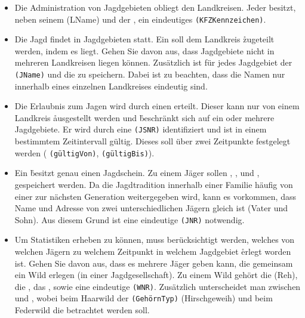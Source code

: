 \documentclass{bschlangaul-aufgabe}
\begin{document}
\begin{itemize}
\item Die Administration von Jagdgebieten obliegt den Landkreisen. Jeder
 besitzt, neben seinem  (LName) und der
, ein eindeutiges 
\texttt{(KFZKennzeichen)}.

\item Die Jagd findet in Jagdgebieten statt. Ein  soll dem
Landkreis \r{zugeteilt} werden, indem es liegt. Gehen Sie davon aus,
dass Jagdgebiete nicht in mehreren Landkreisen liegen können. Zusätzlich
ist für jedes Jagdgebiet der  \texttt{(JName)} und die
 zu speichern. Dabei ist zu beachten, dass die Namen nur
innerhalb eines einzelnen Landkreises eindeutig sind.

\item Die Erlaubnis zum Jagen wird durch einen  erteilt.
Dieser kann nur von einem Landkreis \r{ausgestellt} werden und
\r{beschränkt} sich auf ein oder mehrere Jagdgebiete. Er wird durch eine
 \texttt{(JSNR)} identifiziert und ist in einem
bestimmtem Zeitintervall gültig. Dieses soll über zwei Zeitpunkte
festgelegt werden ( \texttt{(gültigVon)}, 
\texttt{(gültigBis)}).

\item Ein  \r{besitzt} genau einen Jagdschein. Zu einem Jäger
sollen , ,  und , gespeichert
werden. Da die Jagdtradition innerhalb einer Familie häufig von einer
zur nächsten Generation weitergegeben wird, kann es vorkommen, dass Name
und Adresse von zwei unterschiedlichen Jägern gleich ist (\zB Vater
und Sohn). Aus diesem Grund ist eine eindeutige
 \texttt{(JNR)} notwendig.

\item Um Statistiken erheben zu können, muss berücksichtigt werden,
welches  von welchen Jägern zu welchem Zeitpunkt in welchem
Jagdgebiet \r{erlegt} worden ist. Gehen Sie davon aus, dass es mehrere
Jäger geben kann, die gemeinsam ein Wild erlegen (\zB in einer
Jagdgesellschaft). Zu einem Wild gehört die  (\zB Reh), die
, das , sowie eine eindeutige
 \texttt{(WNR)}. Zusätzlich unterscheidet man
zwischen  und , wobei beim Haarwild der  \texttt{(GehörnTyp)} (\zB Hirschgeweih) und beim
Federwild die  betrachtet werden soll.
\end{itemize}
\end{document}
